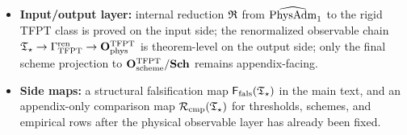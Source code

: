\begin{tcolorbox}[colback=tfptblue!2, colframe=tfptblue!40, breakable,
    title={Closed theorem surface}, colbacktitle=tfptblue!60]
\begin{itemize}[leftmargin=1.5em, topsep=3pt, itemsep=3pt]
    essential injectivity on the rigid image, and the canonical rigid object $\Tstar$.
    \item \textbf{Input/output layer:} internal reduction $\mathfrak R$ from $\widehat{\mathrm{PhysAdm}}_1$ to the rigid TFPT class is proved on the input side; the renormalized observable chain $\mathfrak T_{\star}\to\Gamma_{\mathrm{TFPT}}^{\mathrm{ren}}\to\mathbf O_{\mathrm{phys}}^{\mathrm{TFPT}}$ is theorem-level on the output side; only the final scheme projection to $\mathbf O_{\mathrm{scheme}}^{\mathrm{TFPT}}/\mathbf{Sch}$ remains appendix-facing.
    \item \textbf{Side maps:} a structural falsification map $\mathsf F_{\mathrm{fals}}(\mathfrak T_{\star})$ in the main text, and an appendix-only comparison map $\mathcal R_{\mathrm{cmp}}(\mathfrak T_{\star})$ for thresholds, schemes, and empirical rows after the physical observable layer has already been fixed.
\end{itemize}
\end{tcolorbox}

